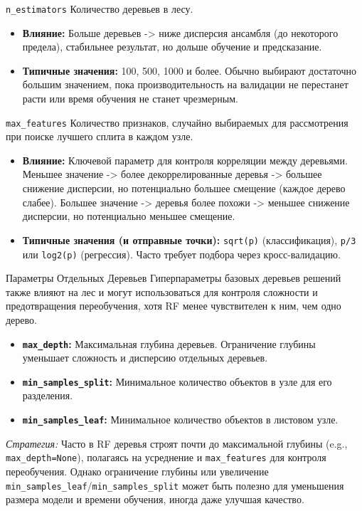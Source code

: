 \begin{myblock}{\texttt{n\_estimators}}
    Количество деревьев в лесу.
    \begin{itemize}[nosep, leftmargin=*]
        \item \textbf{Влияние:} Больше деревьев -> ниже дисперсия ансамбля (до некоторого предела), стабильнее результат, но дольше обучение и предсказание.
        \item \textbf{Типичные значения:} 100, 500, 1000 и более. Обычно выбирают достаточно большим значением, пока производительность на валидации не перестанет расти или время обучения не станет чрезмерным.
    \end{itemize}
\end{myblock}

\begin{myblock}{\texttt{max\_features}}
    Количество признаков, случайно выбираемых для рассмотрения при поиске лучшего сплита в каждом узле.
    \begin{itemize}[nosep, leftmargin=*]
        \item \textbf{Влияние:} Ключевой параметр для контроля корреляции между деревьями. Меньшее значение -> более декоррелированные деревья -> большее снижение дисперсии, но потенциально большее смещение (каждое дерево слабее). Большее значение -> деревья более похожи -> меньшее снижение дисперсии, но потенциально меньшее смещение.
        \item \textbf{Типичные значения (и отправные точки):} \texttt{sqrt(p)} (классификация), \texttt{p/3} или \texttt{log2(p)} (регрессия). Часто требует подбора через кросс-валидацию.
    \end{itemize}
\end{myblock}

\begin{myblock}{Параметры Отдельных Деревьев}
    Гиперпараметры базовых деревьев решений также влияют на лес и могут использоваться для контроля сложности и предотвращения переобучения, хотя RF менее чувствителен к ним, чем одно дерево.
    \begin{itemize}[nosep, leftmargin=*]
        \item \textbf{\texttt{max\_depth}:} Максимальная глубина деревьев. Ограничение глубины уменьшает сложность и дисперсию отдельных деревьев.
        \item \textbf{\texttt{min\_samples\_split}:} Минимальное количество объектов в узле для его разделения.
        \item \textbf{\texttt{min\_samples\_leaf}:} Минимальное количество объектов в листовом узле.
    \end{itemize}
    \textit{Стратегия:} Часто в RF деревья строят почти до максимальной глубины (e.g., \texttt{max\_depth=None}), полагаясь на усреднение и \texttt{max\_features} для контроля переобучения. Однако ограничение глубины или увеличение \texttt{min\_samples\_leaf}/\texttt{min\_samples\_split} может быть полезно для уменьшения размера модели и времени обучения, иногда даже улучшая качество.
\end{myblock}

